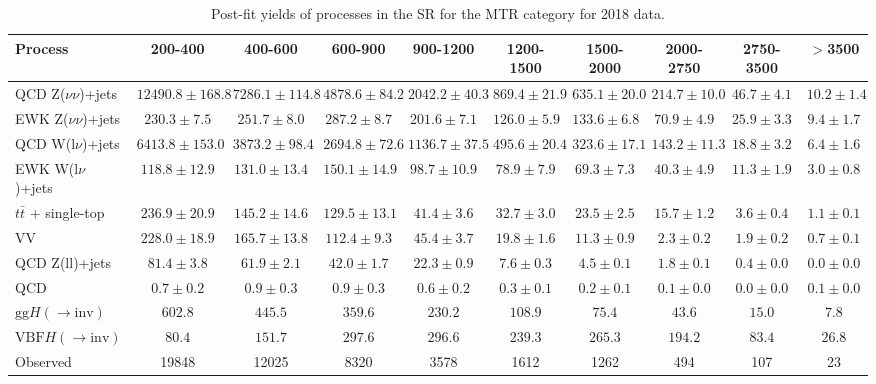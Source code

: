 \begin{table}
    \centering
    \footnotesize
\begin{tabular}{l|c|c|c|c|c|c|c|c|c}
Process & 200-400 & 400-600 & 600-900 & 900-1200 & 1200-1500 & 1500-2000 & 2000-2750 & 2750-3500 & $>$3500  \\
\hline
\hline
QCD Z($\nu\nu$)+jets  & $12490.8\pm168.8$ & $7286.1\pm114.8$ & $4878.6\pm84.2$ & $2042.2\pm40.3$ & $869.4\pm21.9$ & $635.1\pm20.0$ & $214.7\pm10.0$ & $46.7\pm4.1$ & $10.2\pm1.4$\\
EWK Z($\nu\nu$)+jets  & $230.3\pm7.5$ & $251.7\pm8.0$ & $287.2\pm8.7$ & $201.6\pm7.1$ & $126.0\pm5.9$ & $133.6\pm6.8$ & $70.9\pm4.9$ & $25.9\pm3.3$ & $9.4\pm1.7$\\
QCD W(l$\nu$)+jets  & $6413.8\pm153.0$ & $3873.2\pm98.4$ & $2694.8\pm72.6$ & $1136.7\pm37.5$ & $495.6\pm20.4$ & $323.6\pm17.1$ & $143.2\pm11.3$ & $18.8\pm3.2$ & $6.4\pm1.6$\\
EWK W(l$\nu$)+jets  & $118.8\pm12.9$ & $131.0\pm13.4$ & $150.1\pm14.9$ & $98.7\pm10.9$ & $78.9\pm7.9$ & $69.3\pm7.3$ & $40.3\pm4.9$ & $11.3\pm1.9$ & $3.0\pm0.8$\\
$t\bar{t}$ + single-top  & $236.9\pm20.9$ & $145.2\pm14.6$ & $129.5\pm13.1$ & $41.4\pm3.6$ & $32.7\pm3.0$ & $23.5\pm2.5$ & $15.7\pm1.2$ & $3.6\pm0.4$ & $1.1\pm0.1$\\
VV  & $228.0\pm18.9$ & $165.7\pm13.8$ & $112.4\pm9.3$ & $45.4\pm3.7$ & $19.8\pm1.6$ & $11.3\pm0.9$ & $2.3\pm0.2$ & $1.9\pm0.2$ & $0.7\pm0.1$\\
QCD Z(ll)+jets  & $81.4\pm3.8$ & $61.9\pm2.1$ & $42.0\pm1.7$ & $22.3\pm0.9$ & $7.6\pm0.3$ & $4.5\pm0.1$ & $1.8\pm0.1$ & $0.4\pm0.0$ & $0.0\pm0.0$\\
QCD  & $0.7\pm0.2$ & $0.9\pm0.3$ & $0.9\pm0.3$ & $0.6\pm0.2$ & $0.3\pm0.1$ & $0.2\pm0.1$ & $0.1\pm0.0$ & $0.0\pm0.0$ & $0.1\pm0.0$\\
\hline
$\mathrm{gg}H(\rightarrow \mathrm{inv})$  & $602.8$ & $445.5$ & $359.6$ & $230.2$ & $108.9$ & $75.4$ & $43.6$ & $15.0$ & $7.8$\\
$\mathrm{VBF}H(\rightarrow \mathrm{inv})$  & $80.4$ & $151.7$ & $297.6$ & $296.6$ & $239.3$ & $265.3$ & $194.2$ & $83.4$ & $26.8$\\
\hline
Observed & 19848 & 12025 & 8320 & 3578 & 1612 & 1262 & 494 & 107 & 23\\
\hline
\end{tabular}
    \caption{Post-fit yields of processes in the SR for the MTR category for 2018 data.}
    \label{app:MTR_2018_yield}
\end{table}


